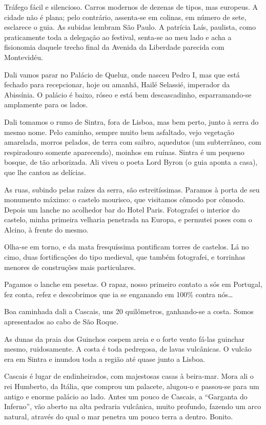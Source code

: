 Tráfego fácil e silencioso. Carros modernos de dezenas de tipos, mas europeus. A cidade não é plana; pelo contrário, assenta-se em colinas, em número de sete, esclarece o guia. As subidas lembram São Paulo. A patrícia Laís, paulista, como praticamente toda a delegação ao festival, senta-se ao meu lado e acha a fisionomia daquele trecho final da Avenida da Liberdade parecida com Montevidéu.

Dali vamos parar no Palácio de Queluz, onde nasceu Pedro I, mas que está fechado para recepcionar, hoje ou amanhã, Hailé Selassié, imperador da Abissínia. O palácio é baixo, róseo e está bem descascadinho, esparramando-se amplamente para os lados.

Dali tomamos o rumo de Sintra, fora de Lisboa, mas bem perto, junto à serra do mesmo nome. Pelo caminho, sempre muito bem asfaltado, vejo vegetação amarelada, morros pelados, de terra com saibro, aquedutos (um subterrâneo, com respiradouro somente aparecendo), moinhos em ruínas. Sintra é um pequeno bosque, de tão arborizada. Ali viveu o poeta Lord Byron (o guia aponta a casa), que lhe cantou as delícias.

As ruas, subindo pelas raízes da serra, são estreitíssimas. Paramos à porta de seu monumento máximo: o castelo mourisco, que visitamos cômodo por cômodo. Depois um lanche no acolhedor bar do Hotel Paris. Fotografei o interior do castelo, minha primeira velharia penetrada na Europa, e permutei poses com o Alcino, à frente do mesmo.

Olha-se em torno, e da mata fresquíssima pontificam torres de castelos. Lá no cimo, duas fortificações do tipo medieval, que também fotografei, e torrinhas menores de construções mais particulares.

Pagamos o lanche em pesetas. O rapaz, nosso primeiro contato a sós em Portugal, fez conta, refez e descobrimos que ia se enganando em 100\% contra nós\ldots

Boa caminhada dali a Cascais, uns 20 quilômetros, ganhando-se a costa. Somos apresentados ao cabo de São Roque.

As dunas da praia dos Guinchos cospem areia e o forte vento fá-las guinchar mesmo, ruidosamente. A costa é toda pedregosa, de lavas vulcânicas. O vulcão era em Sintra e inundou toda a região até quase junto a Lisboa.

Cascais é lugar de endinheirados, com majestosas casas à beira-mar. Mora ali o rei Humberto, da Itália, que comprou um palacete, alugou-o e passou-se para um antigo e enorme palácio ao lado. Antes um pouco de Cascais, a ``Garganta do Inferno'', vão aberto na alta pedraria vulcânica, muito profundo, fazendo um arco natural, através do qual o mar penetra um pouco terra a dentro. Bonito.

